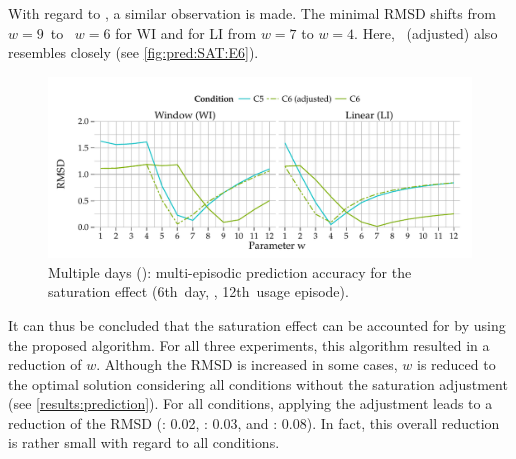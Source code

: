 With regard to , a similar observation is made.
The minimal \ac{RMSD} shifts from $\mathit{w}=9$~to~ $\mathit{w}=6$ for WI and for LI from $\mathit{w}=7$ to $\mathit{w}=4$.
Here, ~(adjusted) also resembles  closely (see \autoref{fig:pred:SAT:E6}).

\begin{figure}
	\centering
\begin{knitrout}
\color{fgcolor}
\includegraphics[width=\maxwidth]{figure/plotE6SAT-1} 

\end{knitrout}
	\caption[Multiple days ():  multi-episodic prediction accuracy for the saturation effect]{Multiple days ():  multi-episodic prediction accuracy for the saturation effect (6th~day, \ie, 12th~usage episode).}
	\label{fig:pred:SAT:E6}
\end{figure}

It can thus be concluded that the saturation effect can be accounted for by using the proposed algorithm.
For all three experiments, this algorithm resulted in a reduction of $\mathit{w}$.
Although the \ac{RMSD} is increased in some cases, $\mathit{w}$ is reduced to the optimal solution considering all conditions without the saturation adjustment (see \autoref{results:prediction}).
For all conditions, applying the adjustment leads to a reduction of the \ac{RMSD} (: 0.02, \EIIa{}: 0.03, and : 0.08).
In fact, this overall reduction is rather small with regard to all conditions.


